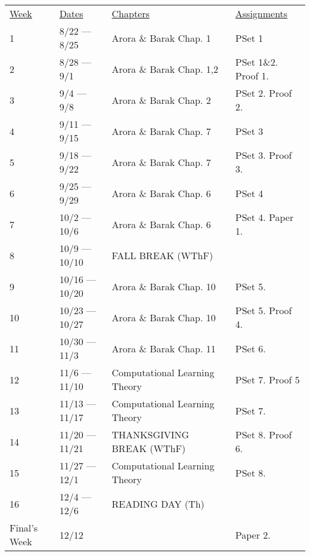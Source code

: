 \documentclass[nobib]{tufte-handout}
\begin{document}
\begin{center}
\begin{tabular}{llll}
\underline{Week} & \underline{Dates} & \underline{Chapters} & \underline{Assignments} \\

1 & 8/22 --- 8/25 &  Arora \& Barak Chap. 1 & PSet 1\\

2 & 8/28 --- 9/1 &  Arora \& Barak Chap. 1,2 & PSet 1\&2. Proof 1.\\

3 & 9/4 --- 9/8 &  Arora \& Barak Chap. 2 & PSet 2. Proof 2.\\

4 & 9/11 --- 9/15 & Arora \& Barak Chap. 7 & PSet 3\\

5 & 9/18 --- 9/22 &  Arora \& Barak Chap. 7 & PSet 3. Proof 3.\\

6 & 9/25 --- 9/29 &  Arora \& Barak Chap. 6 & PSet 4\\

7 & 10/2 --- 10/6 &   Arora \& Barak Chap. 6 & PSet 4. Paper 1.\\

8 & 10/9 --- 10/10 &  FALL BREAK (WThF)\\

9 & 10/16 --- 10/20 &  Arora \& Barak Chap. 10 & PSet 5.\\

10 & 10/23 --- 10/27 &  Arora \& Barak Chap. 10 & PSet 5. Proof 4.\\

11 & 10/30 --- 11/3 &  Arora \& Barak Chap. 11 & PSet 6. \\

12 & 11/6 --- 11/10 &  Computational Learning Theory & PSet 7. Proof 5\\

13 & 11/13 --- 11/17 &   Computational Learning Theory & PSet 7. \\

14 & 11/20 --- 11/21 &  THANKSGIVING BREAK (WThF) & PSet 8. Proof 6.\\

15 & 11/27 --- 12/1 &  Computational Learning Theory &  PSet 8.\\

16 & 12/4 --- 12/6 & READING DAY (Th) & \\

Final's Week & 12/12 &  & Paper 2. \\

\end{tabular}
\end{center}
\end{document}
